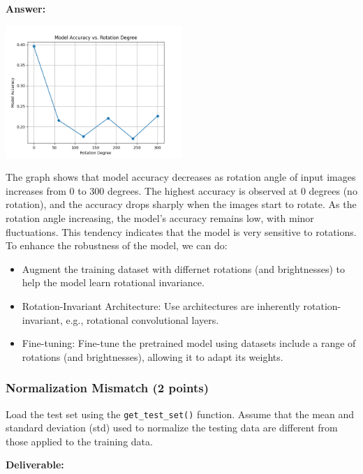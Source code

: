 \documentclass[11pt, oneside]{article}   	%
\begin{document}
\textbf{Answer:} \\
\begin{center}
    \includegraphics[width=0.5\textwidth]{report_pic/Rotation_accuracy.png}
\end{center}
The graph shows that model accuracy decreases as rotation angle of input images increases from 0 to 300 degrees.
The highest accuracy is observed at 0 degrees (no rotation), and the accuracy drops sharply when the images start to rotate.
As the rotation angle increasing, the model's accuracy remains low, with  minor fluctuations. 
This tendency indicates that the model is very sensitive to rotations. 
\\
To enhance the robustness of the model, we can do:
\begin{itemize}
    \item Augment the training dataset with differnet rotations (and brightnesses) to help the model learn rotational invariance.
    \item Rotation-Invariant Architecture: Use architectures are inherently rotation-invariant, e.g., rotational convolutional layers.
    \item Fine-tuning: Fine-tune the pretrained model using datasets include a range of rotations (and brightnesses), allowing it to adapt its weights.
\end{itemize}

\subsubsection*{Normalization Mismatch (2 points)}

Load the test set using the \texttt{get\_test\_set()} function. Assume that the mean and standard deviation (std) used to normalize the testing data are different from those applied to the training data.

\noindent\textbf{Deliverable:}
\end{document}
